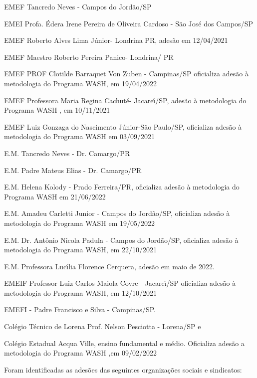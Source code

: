 \documentclass[
12pt,		%
openright,	%
twoside,  %
a4paper,			%
chapter=TITLE,		%
english,			%
french,				%
spanish,			%
brazil				%
]{USPSC-classe/USPSC}
\begin{document}
\begin{alineas}
\item EMEF Tancredo Neves - Campos do Jord\~ao/SP
\item EMEI Profa. \'Edera Irene Pereira de Oliveira Cardoso - S\~ao Jos\'e dos Campos/SP
\item EMEF Roberto Alves Lima J\'unior- Londrina PR, ades\~ao em 12/04/2021
\item EMEF Maestro Roberto Pereira Panico- Londrina/ PR
\item EMEF PROF Clotilde Barraquet Von Zuben - Campinas/SP oficializa ades\~ao \`a metodologia do Programa WASH, em 19/04/2022
\item EMEF Professora Maria Regina Cachut\'e- Jacare\'{\i}/SP, ades\~ao \`a metodologia do Programa WASH , em 10/11/2021
\item EMEF Luiz Gonzaga do Nascimento J\'unior-S\~ao Paulo/SP, oficializa ades\~ao \`a metodologia do Programa WASH em 03/09/2021
\item E.M. Tancredo Neves - Dr. Camargo/PR
\item E.M. Padre Mateus Elias - Dr. Camargo/PR
\item E.M. Helena Kolody - Prado Ferreira/PR, oficializa ades\~ao \`a metodologia do Programa WASH em 21/06/2022
\item E.M. Amadeu Carletti Junior - Campos do Jord\~ao/SP, oficializa ades\~ao \`a metodologia do Programa WASH em 19/05/2022
\item E.M. Dr. Ant\^onio Nicola Padula - Campos do Jord\~ao/SP, oficializa ades\~ao \`a metodologia do Programa WASH,  em 22/10/2021
\item E.M. Professora Luc\'{\i}lia Florence Cerquera, ades\~ao em maio de 2022.
\item EMEIF Professor Luiz Carlos Maiola Covre - Jacare\'{\i}/SP oficializa ades\~ao \`a metodologia do Programa WASH, em 12/10/2021
\item EMEFI -  Padre Francisco e Silva - Campinas/SP.
\item Col\'egio T\'ecnico de Lorena Prof. Nelson Pesciotta - Lorena/SP e
\item Col\'egio  Estadual Acqua Ville, ensino fundamental e  m\'edio.  Oficializa ades\~ao a metodologia do Programa WASH ,em 09/02/2022
\end{alineas}

Foram identificadas as ades\~oes das seguintes organiza\c{c}\~oes sociais e sindicatos:
\end{document}

